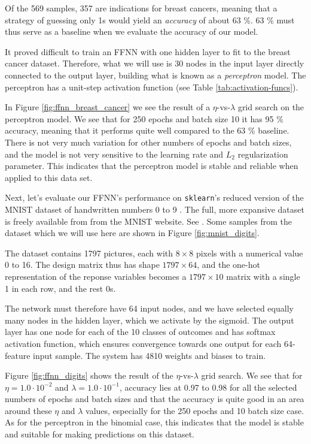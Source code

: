 \documentclass[]{article}
\begin{document}
Of the 569 samples, 357 are  indications for breast cancers, meaning that a strategy of guessing only 1s would yield an \textit{accuracy} of about 63 \%. 63 \% must thus serve as a baseline when we evaluate the accuracy of our model.

It proved difficult to train an FFNN with one hidden layer to fit to the breast cancer dataset. Therefore, what we will use is 30 nodes in the input layer directly connected to the output layer, building what is known as a \textit{perceptron} model. The perceptron has a unit-step activation function (see Table \ref{tab:activation-funcs}).

In Figure \ref{fig:ffnn_breast_cancer} we see the result of a $\eta$-vs-$\lambda$ grid search on the perceptron model. We see that for 250 epochs and batch size 10 it has 95 \% accuracy, meaning that it performs quite well compared to the 63 \% baseline. There is not very much variation for other numbers of epochs and batch sizes, and the model is not very sensitive to the learning rate and $L_2$ regularization parameter. This indicates that the perceptron model is stable and reliable when applied to this data set.

\vspace{5mm}

Next, let's evaluate our FFNN's performance on \lstinline|sklearn|'s reduced version of the MNIST dataset of handwritten numbers 0 to 9 \cite{skl-datasets}. The full, more expansive dataset is freely available from from the MNIST website. See \cite{mnist}. Some samples from the dataset which we will use here are shown in Figure \ref{fig:mnist_digits}. 

The dataset contains 1797 pictures, each with $8 \times 8$ pixels with a numerical value 0 to 16. The design matrix thus has shape $1797 \times 64$, and the one-hot representation of the reponse variables becomes a $1797 \times 10$ matrix with a single 1 in each row, and the rest 0s.

The network must therefore have 64 input nodes, and we have selected equally many nodes in the hidden layer, which we activate by the sigmoid. The output layer has one node for each of the 10 classes of outcomes and has softmax activation function, which ensures convergence towards one output for each 64-feature input sample. The system has 4810 weights and biases to train.

Figure \ref{fig:ffnn_digits} shows the result of the $\eta$-vs-$\lambda$ grid search. We see that for $\eta = 1.0 \cdot 10^{-2}$ and $\lambda = 1.0 \cdot 10^{-1}$, accuracy lies at 0.97 to 0.98 for all the selected numbers of epochs and batch sizes and that the accuracy is quite good in an area around these $\eta$ and $\lambda$ values, especially for the 250 epochs and 10 batch size case. As for the perceptron in the binomial case, this indicates that the model is stable and suitable for making predictions on this dataset.
\end{document}
